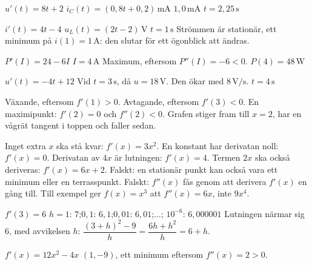 \begin{facit}
  $u'(t) = 8t + 2$  $i_C(t) = (0{,}8t + 0{,}2)\,\text{mA}$
 $1{,}0\,\text{mA}$  $t = 2{,}25\,\text{s}$

  $i'(t) = 4t - 4$  $u_L(t) = (2t - 2)\,\text{V}$  $t = 1\,\text{s}$
 Strömmen är stationär, ett minimum på $i(1) = 1\,\text{A}$: den slutar för ett ögonblick
att ändras.

  $P'(I) = 24 - 6I$  $I = 4\,\text{A}$
 Maximum, eftersom $P''(I) = -6 < 0$.  $P(4) = 48\,\text{W}$

  $u'(t) = -4t + 12$  Vid $t = 3\,\text{s}$, då $u = 18\,\text{V}$.
 Den ökar med $8\,\text{V/s}$.  $t = 4\,\text{s}$

  Växande, eftersom $f'(1) > 0$.  Avtagande, eftersom $f'(3) < 0$.
 En maximipunkt: $f'(2) = 0$ och $f''(2) < 0$.
 Grafen stiger fram till $x = 2$, har en vågrät tangent i toppen och faller sedan.

  Inget extra $x$ ska stå kvar: $f'(x) = 3x^2$.
 En konstant har derivatan noll: $f'(x) = 0$.
 Derivatan av $4x$ är lutningen: $f'(x) = 4$.
 Termen $2x$ ska också deriveras: $f'(x) = 6x + 2$.
 Falskt: en stationär punkt kan också vara ett minimum eller en terrasspunkt.
 Falskt: $f''(x)$ fås genom att derivera $f'(x)$ en gång till. Till exempel ger $f(x) = x^3$
att $f''(x) = 6x$, inte $9x^4$.

  $f'(3) = 6$
 $h = 1$: $7$;\enspace $0{,}1$: $6{,}1$;\enspace $0{,}01$: $6{,}01$;\enspace $\ldots$;\enspace
$10^{-6}$: $6{,}000001$
 Lutningen närmar sig $6$, med avvikelsen $h$:
$\dfrac{(3 + h)^2 - 9}{h} = \dfrac{6h + h^2}{h} = 6 + h$.

  $f'(x) = 12x^2 - 4x$
 $(1, -9)$, ett minimum eftersom $f''(x) = 2 > 0$.

\end{facit}
